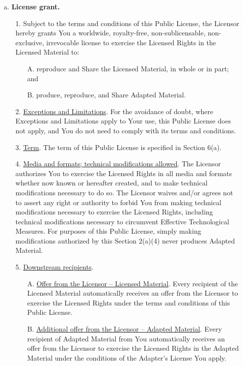 \begin{itemize}
    \item[a.] \textbf{License grant.}
    \begin{itemize}
        \item[1.] Subject to the terms and conditions of this Public License, the Licensor hereby grants You a worldwide, royalty-free, non-sublicensable, non-exclusive, irrevocable license to exercise the Licensed Rights in the Licensed Material to:
        \begin{itemize}
            \item[A.] reproduce and Share the Licensed Material, in whole or in part; and
            \item[B.] produce, reproduce, and Share Adapted Material.
        \end{itemize}
        \item[2.] \underline{Exceptions and Limitations}. For the avoidance of doubt, where Exceptions and Limitations apply to Your use, this Public License does not apply, and You do not need to comply with its terms and conditions.
        \item[3.] \underline{Term}. The term of this Public License is specified in Section 6(a).
        \item[4.] \underline{Media and formats; technical modifications allowed}. The Licensor authorizes You to exercise the Licensed Rights in all media and formats whether now known or hereafter created, and to make technical modifications necessary to do so. The Licensor waives and/or agrees not to assert any right or authority to forbid You from making technical modifications necessary to exercise the Licensed Rights, including technical modifications necessary to circumvent Effective Technological Measures. For purposes of this Public License, simply making modifications authorized by this Section 2(a)(4) never produces Adapted Material.
        \item[5.] \underline{Downstream recipients}.
        \begin{itshape}\begin{itemize}
            \item[A.] \underline{Offer from the Licensor -- Licensed Material}. Every recipient of the Licensed Material automatically receives an offer from the Licensor to exercise the Licensed Rights under the terms and conditions of this Public License.
            \item[B.] \underline{Additional offer from the Licensor -- Adapted Material}. Every recipient of Adapted Material from You automatically receives an offer from the Licensor to exercise the Licensed Rights in the Adapted Material under the conditions of the Adapter's License You apply.

\end{itemize}
\end{itshape}
\end{itemize}
\end{itemize}
